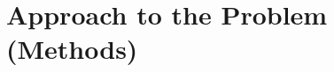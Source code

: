 \documentclass{article}
\begin{document}























\section{Approach to the Problem (Methods)}
\end{document}

